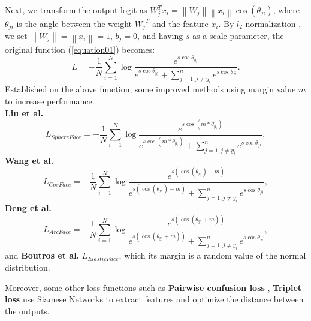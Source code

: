 Next, we transform the output logit \cite{pereyra2017regularizing} as $W_{j}^{T}{{x}_{i}}=\left\| {{W}_{j}} \right\|\left\| {{x}_{i}} \right\|\cos \left( {{\theta }_{ji}} \right)$, where ${{\theta }_{ji}}$ is the angle between the weight ${{W}_{j}}^{T}$ and the feature ${{x}_{i}}$. By $l_{2}$ normalization \cite{wang2017normface}, we set $\left\| {{W}_{j}} \right\|=\left\| {{x}_{i}} \right\|=1$, ${{b}_{j}}=0$, and having $s$ as a scale parameter, the original function (\ref{equation01}) becomes:
\begin{equation}
\label{equation02}
    L=-\frac{1}{N}\sum\limits_{i=1}^{N}{\log }\frac{{{e}^{s\cos {{\theta }_{{{y}_{i}}}}}}}{{{e}^{s\cos {{\theta }_{{{y}_{i}}}}}}+\sum\limits_{j=1,j\ne {{y}_{i}}}^{n}{{{e}^{s\cos {{\theta }_{ji}}}}}}.
\end{equation}
Established on the above function, some improved methods using margin value $m$ to increase performance.\\
\textbf{Liu et al.} \cite{liu2017sphereface}
\begin{equation}
\label{equation03}
    L_{SphereFace}=-\frac{1}{N}\sum\limits_{i=1}^{N}{\log }\frac{{{e}^{s\cos \left( m*{{\theta }_{{{y}_{i}}}} \right)}}}{{{e}^{s\cos \left( m*{{\theta }_{{{y}_{i}}}} \right)}}+\sum\limits_{j=1,j\ne {{y}_{i}}}^{n}{{{e}^{s\cos {{\theta }_{ji}}}}}},
\end{equation}
\textbf{Wang et al.} \cite{wang2018cosface}
\begin{equation}
\label{equation04}
    L_{CosFace}=-\frac{1}{N}\sum\limits_{i=1}^{N}{\log }\frac{{{e}^{s\left( \cos \left( {{\theta }_{{{y}_{i}}}} \right)-m \right)}}}{{{e}^{s\left( \cos \left( {{\theta }_{{{y}_{i}}}} \right)-m \right)}}+\sum\limits_{j=1,j\ne {{y}_{i}}}^{n}{{{e}^{s\cos {{\theta }_{ji}}}}}},
\end{equation}
\textbf{Deng et al.} \cite{deng2019arcface}
\begin{equation}
\label{equation05}
    L_{ArcFace}=-\frac{1}{N}\sum\limits_{i=1}^{N}{\log }\frac{{{e}^{s\left( \cos \left( {{\theta }_{{{y}_{i}}}}+m \right) \right)}}}{{{e}^{s\left( \cos \left( {{\theta }_{{{y}_{i}}}}+m \right) \right)}}+\sum\limits_{j=1,j\ne {{y}_{i}}}^{n}{{{e}^{s\cos {{\theta }_{ji}}}}}},
\end{equation}
and \textbf{Boutros et al.} \cite{boutros2022elasticface} $L_{ElasticFace}$, which its margin is a random value of the normal distribution.

Moreover, some other loss functions such as \textbf{Pairwise confusion loss} \cite{dubey2018pairwise}, \textbf{Triplet loss} \cite{schroff2015facenet}  use Siamese Networks to extract features and optimize the distance between the outputs.